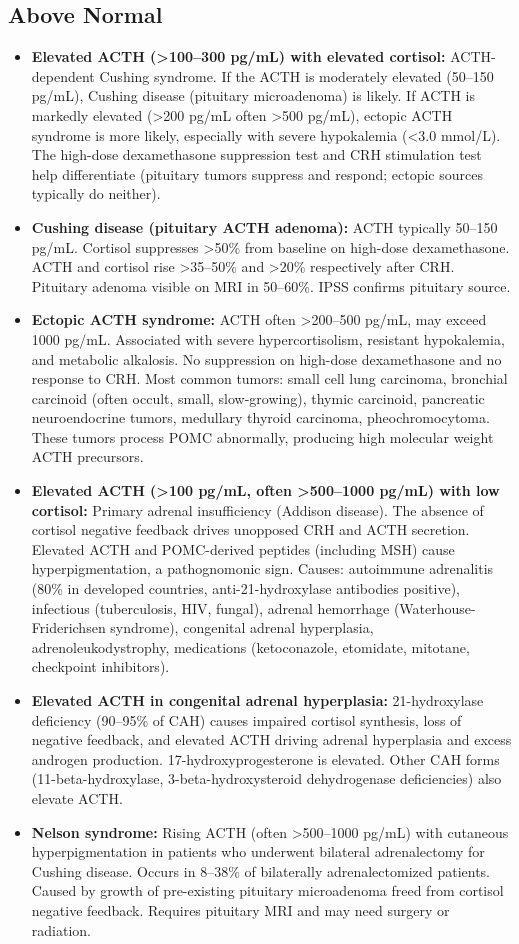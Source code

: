 \subsection*{Above Normal}
\begin{itemize}
  \item \textbf{Elevated ACTH (>100--300 pg/mL) with elevated cortisol:} ACTH-dependent Cushing syndrome. If the ACTH is moderately elevated (50--150 pg/mL), Cushing disease (pituitary microadenoma) is likely. If ACTH is markedly elevated (>200 pg/mL often >500 pg/mL), ectopic ACTH syndrome is more likely, especially with severe hypokalemia (<3.0 mmol/L). The high-dose dexamethasone suppression test and CRH stimulation test help differentiate (pituitary tumors suppress and respond; ectopic sources typically do neither).
  \item \textbf{Cushing disease (pituitary ACTH adenoma):} ACTH typically 50--150 pg/mL. Cortisol suppresses >50\% from baseline on high-dose dexamethasone. ACTH and cortisol rise >35--50\% and >20\% respectively after CRH. Pituitary adenoma visible on MRI in 50--60\%. IPSS confirms pituitary source.
  \item \textbf{Ectopic ACTH syndrome:} ACTH often >200--500 pg/mL, may exceed 1000 pg/mL. Associated with severe hypercortisolism, resistant hypokalemia, and metabolic alkalosis. No suppression on high-dose dexamethasone and no response to CRH. Most common tumors: small cell lung carcinoma, bronchial carcinoid (often occult, small, slow-growing), thymic carcinoid, pancreatic neuroendocrine tumors, medullary thyroid carcinoma, pheochromocytoma. These tumors process POMC abnormally, producing high molecular weight ACTH precursors.
  \item \textbf{Elevated ACTH (>100 pg/mL, often >500--1000 pg/mL) with low cortisol:} Primary adrenal insufficiency (Addison disease). The absence of cortisol negative feedback drives unopposed CRH and ACTH secretion. Elevated ACTH and POMC-derived peptides (including MSH) cause hyperpigmentation, a pathognomonic sign. Causes: autoimmune adrenalitis (80\% in developed countries, anti-21-hydroxylase antibodies positive), infectious (tuberculosis, HIV, fungal), adrenal hemorrhage (Waterhouse-Friderichsen syndrome), congenital adrenal hyperplasia, adrenoleukodystrophy, medications (ketoconazole, etomidate, mitotane, checkpoint inhibitors).
  \item \textbf{Elevated ACTH in congenital adrenal hyperplasia:} 21-hydroxylase deficiency (90--95\% of CAH) causes impaired cortisol synthesis, loss of negative feedback, and elevated ACTH driving adrenal hyperplasia and excess androgen production. 17-hydroxyprogesterone is elevated. Other CAH forms (11-beta-hydroxylase, 3-beta-hydroxysteroid dehydrogenase deficiencies) also elevate ACTH.
  \item \textbf{Nelson syndrome:} Rising ACTH (often >500--1000 pg/mL) with cutaneous hyperpigmentation in patients who underwent bilateral adrenalectomy for Cushing disease. Occurs in 8--38\% of bilaterally adrenalectomized patients. Caused by growth of pre-existing pituitary microadenoma freed from cortisol negative feedback. Requires pituitary MRI and may need surgery or radiation.
\end{itemize}


